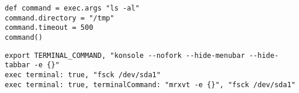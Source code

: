 \begin{lstlisting}[style=Groovybash, label={lst:example_exec2}, title={
Deleyed execution of external commands.}]
def command = exec.args "ls -al"
command.directory = "/tmp"
command.timeout = 500
command()
\end{lstlisting}

\begin{lstlisting}[style=Groovybash, label={lst:example_exec3}, title={
Execute command with an interactive terminal.}]
export TERMINAL_COMMAND, "konsole --nofork --hide-menubar --hide-tabbar -e {}"
exec terminal: true, "fsck /dev/sda1"
exec terminal: true, terminalCommand: "mrxvt -e {}", "fsck /dev/sda1"
\end{lstlisting}

